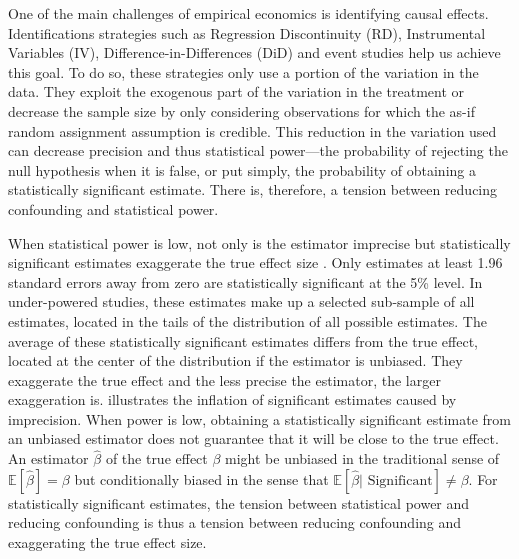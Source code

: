 			One of the main challenges of empirical economics is identifying causal effects. Identifications strategies such as Regression Discontinuity (RD), Instrumental Variables (IV), Difference-in-Differences (DiD) and event studies help us achieve this goal. To do so, these strategies only use a portion of the variation in the data. They exploit the exogenous part of the variation in the treatment or decrease the sample size by only considering observations for which the as-if random assignment assumption is credible. This reduction in the variation used can decrease precision and thus statistical power---the probability of rejecting the null hypothesis when it is false, or put simply, the probability of obtaining a statistically significant estimate. There is, therefore, a tension between reducing confounding and statistical power.
			
			When statistical power is low, not only is the estimator imprecise but statistically significant estimates exaggerate the true effect size \citep{gelmanType2000, ioannidis_why_2008, gelman_beyond_2014}. Only estimates at least 1.96 standard errors away from zero are statistically significant at the 5\% level. In under-powered studies, these estimates make up a selected sub-sample of all estimates, located in the tails of the distribution of all possible estimates. The average of these statistically significant estimates differs from the true effect, located at the center of the distribution if the estimator is unbiased. They exaggerate the true effect and the less precise the estimator, the larger exaggeration is.   illustrates the inflation of significant estimates caused by imprecision. When power is low, obtaining a statistically significant estimate from an unbiased estimator does not guarantee that it will be close to the true effect. An estimator $\hat{\beta}$ of the true effect $\beta$ might be unbiased in the traditional sense of $\mathbb{E}[\hat{\beta}] = \beta$ but conditionally biased in the sense that $\mathbb{E}[\hat{\beta} | \text{ Significant}] \neq \beta$. For statistically significant estimates, the tension between statistical power and reducing confounding is thus a tension between reducing confounding and exaggerating the true effect size.
			
